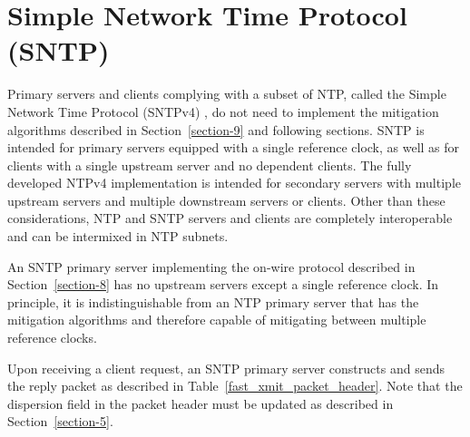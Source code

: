 \chapter{Simple Network Time Protocol (SNTP)}
\label{section-14}

Primary servers and clients complying with a subset of NTP, called
the Simple Network Time Protocol (SNTPv4) \cite{RFC4330}, do not need to
implement the mitigation algorithms described in Section~\ref{section-9} and
following sections. SNTP is intended for primary servers equipped
with a single reference clock, as well as for clients with a single
upstream server and no dependent clients. The fully developed NTPv4
implementation is intended for secondary servers with multiple
upstream servers and multiple downstream servers or clients. Other
than these considerations, NTP and SNTP servers and clients are
completely interoperable and can be intermixed in NTP subnets.

An SNTP primary server implementing the on-wire protocol described in
Section~\ref{section-8} has no upstream servers except a single reference clock.
In principle, it is indistinguishable from an NTP primary server that
has the mitigation algorithms and therefore capable of mitigating
between multiple reference clocks.

Upon receiving a client request, an SNTP primary server constructs
and sends the reply packet as described in Table~\ref{fast_xmit_packet_header}. Note that the
dispersion field in the packet header must be updated as described in
Section~\ref{section-5}.

